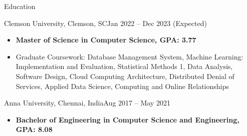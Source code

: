 \documentclass[]{mcdowellcv}
\begin{document}
	\makeheader
	

\begin{cvsection}{Education}
		\begin{cvsubsection}{Clemson University, Clemson, SC}{}{Jan 2022 -- Dec 2023 (Expected)}
			\begin{itemize}
				\item \textbf {Master of Science in Computer Science, GPA: 3.77}
				\item {Graduate Coursework: Database Management System, Machine Learning: Implementation and Evaluation, Statistical Methods 1, Data Analysis, Software Design, Cloud Computing Architecture, Distributed Denial of Services, Applied Data Science, Computing and Online Relationships } 
			\end{itemize}
		\end{cvsubsection}
		\begin{cvsubsection}{Anna University, Chennai, India}{}{Aug 2017 -- May 2021}
			\begin{itemize}
				\item \textbf{Bachelor of Engineering in Computer Science and Engineering, GPA: 8.08}
			\end{itemize}
		\end{cvsubsection}
	\end{cvsection}
\end{document}

